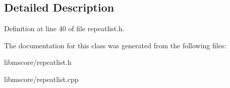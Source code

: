 \subsection{Detailed Description}


Definition at line 40 of file repeatlist.\+h.



The documentation for this class was generated from the following files\+:\begin{DoxyCompactItemize}
\item 
libmscore/repeatlist.\+h\item 
libmscore/repeatlist.\+cpp\end{DoxyCompactItemize}
